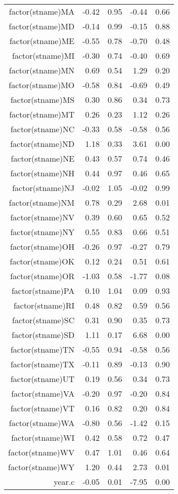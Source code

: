 \begin{table}[ht]
\begin{tabular}{rrrrr}
  factor(stname)MA & -0.42 & 0.95 & -0.44 & 0.66 \\ 
  factor(stname)MD & -0.14 & 0.99 & -0.15 & 0.88 \\ 
  factor(stname)ME & -0.55 & 0.78 & -0.70 & 0.48 \\ 
  factor(stname)MI & -0.30 & 0.74 & -0.40 & 0.69 \\ 
  factor(stname)MN & 0.69 & 0.54 & 1.29 & 0.20 \\ 
  factor(stname)MO & -0.58 & 0.84 & -0.69 & 0.49 \\ 
  factor(stname)MS & 0.30 & 0.86 & 0.34 & 0.73 \\ 
  factor(stname)MT & 0.26 & 0.23 & 1.12 & 0.26 \\ 
  factor(stname)NC & -0.33 & 0.58 & -0.58 & 0.56 \\ 
  factor(stname)ND & 1.18 & 0.33 & 3.61 & 0.00 \\ 
  factor(stname)NE & 0.43 & 0.57 & 0.74 & 0.46 \\ 
  factor(stname)NH & 0.44 & 0.97 & 0.46 & 0.65 \\ 
  factor(stname)NJ & -0.02 & 1.05 & -0.02 & 0.99 \\ 
  factor(stname)NM & 0.78 & 0.29 & 2.68 & 0.01 \\ 
  factor(stname)NV & 0.39 & 0.60 & 0.65 & 0.52 \\ 
  factor(stname)NY & 0.55 & 0.83 & 0.66 & 0.51 \\ 
  factor(stname)OH & -0.26 & 0.97 & -0.27 & 0.79 \\ 
  factor(stname)OK & 0.12 & 0.24 & 0.51 & 0.61 \\ 
  factor(stname)OR & -1.03 & 0.58 & -1.77 & 0.08 \\ 
  factor(stname)PA & 0.10 & 1.04 & 0.09 & 0.93 \\ 
  factor(stname)RI & 0.48 & 0.82 & 0.59 & 0.56 \\ 
  factor(stname)SC & 0.31 & 0.90 & 0.35 & 0.73 \\ 
  factor(stname)SD & 1.11 & 0.17 & 6.68 & 0.00 \\ 
  factor(stname)TN & -0.55 & 0.94 & -0.58 & 0.56 \\ 
  factor(stname)TX & -0.11 & 0.89 & -0.13 & 0.90 \\ 
  factor(stname)UT & 0.19 & 0.56 & 0.34 & 0.73 \\ 
  factor(stname)VA & -0.20 & 0.97 & -0.20 & 0.84 \\ 
  factor(stname)VT & 0.16 & 0.82 & 0.20 & 0.84 \\ 
  factor(stname)WA & -0.80 & 0.56 & -1.42 & 0.15 \\ 
  factor(stname)WI & 0.42 & 0.58 & 0.72 & 0.47 \\ 
  factor(stname)WV & 0.47 & 1.01 & 0.46 & 0.64 \\ 
  factor(stname)WY & 1.20 & 0.44 & 2.73 & 0.01 \\ 
  year.c & -0.05 & 0.01 & -7.95 & 0.00 \\ 
   \hline
\end{tabular}
\end{table}
